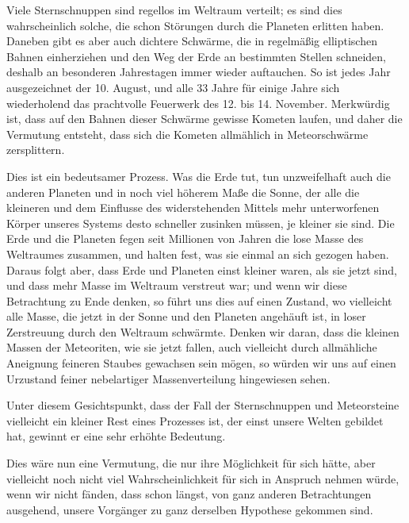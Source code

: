 \documentclass[a4paper, 11pt, oneside, german]{article}
\begin{document}
Viele Sternschnuppen sind regellos im Weltraum verteilt; es sind dies wahrscheinlich solche, die schon Störungen durch die Planeten erlitten haben. Daneben gibt es aber auch dichtere Schwärme, die in regelmäßig elliptischen Bahnen einherziehen und den Weg der Erde an bestimmten Stellen schneiden, deshalb an besonderen Jahrestagen immer wieder auftauchen. So ist jedes Jahr ausgezeichnet der 10. August, und alle 33 Jahre für einige Jahre sich wiederholend das prachtvolle Feuerwerk des 12. bis 14. November. Merkwürdig ist, dass auf den Bahnen dieser Schwärme gewisse Kometen laufen, und daher die Vermutung entsteht, dass sich die Kometen allmählich in Meteorschwärme zersplittern.

Dies ist ein bedeutsamer Prozess. Was die Erde tut, tun unzweifelhaft auch die anderen Planeten und in noch viel höherem Maße die Sonne, der alle die kleineren und dem Einflusse des widerstehenden Mittels mehr unterworfenen Körper unseres Systems desto schneller zusinken müssen, je kleiner sie sind. Die Erde und die Planeten fegen seit Millionen von Jahren die lose Masse des Weltraumes zusammen, und halten fest, was sie einmal an sich gezogen haben. Daraus folgt aber, dass Erde und Planeten einst kleiner waren, als sie jetzt sind, und dass mehr Masse im Weltraum verstreut war; und wenn wir diese Betrachtung zu Ende denken, so führt uns dies auf einen Zustand, wo vielleicht alle Masse, die jetzt in der Sonne und den Planeten angehäuft ist, in loser Zerstreuung durch den Weltraum schwärmte. Denken wir daran, dass die kleinen Massen der Meteoriten, wie sie jetzt fallen, auch vielleicht durch allmähliche Aneignung feineren Staubes gewachsen sein mögen, so würden wir uns auf einen Urzustand feiner nebelartiger Massenverteilung hingewiesen sehen.

Unter diesem Gesichtspunkt, dass der Fall der Sternschnuppen und Meteorsteine vielleicht ein kleiner Rest eines Prozesses ist, der einst unsere Welten gebildet hat, gewinnt er eine sehr erhöhte Bedeutung.

Dies wäre nun eine Vermutung, die nur ihre Möglichkeit für sich hätte, aber vielleicht noch nicht viel Wahrscheinlichkeit für sich in Anspruch nehmen würde, wenn wir nicht fänden, dass schon längst, von ganz anderen Betrachtungen ausgehend, unsere Vorgänger zu ganz derselben Hypothese gekommen sind.
\end{document}
